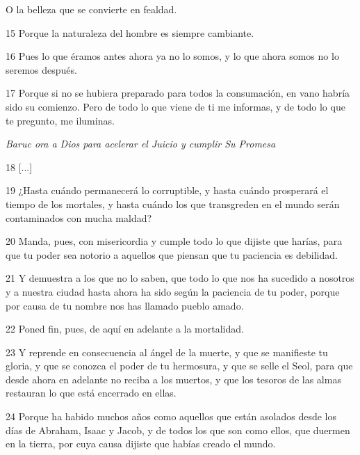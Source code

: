 \par O la belleza que se convierte en fealdad.

\par 15 Porque la naturaleza del hombre es siempre cambiante.

\par 16 Pues lo que éramos antes ahora ya no lo somos, y lo que ahora somos no lo seremos después.

\par 17 Porque si no se hubiera preparado para todos la consumación, en vano habría sido su comienzo. Pero de todo lo que viene de ti me informas, y de todo lo que te pregunto, me iluminas.

\par \textit{Baruc ora a Dios para acelerar el Juicio y cumplir Su Promesa}

\par 18 [...]

\par 19 ¿Hasta cuándo permanecerá lo corruptible, y hasta cuándo prosperará el tiempo de los mortales, y hasta cuándo los que transgreden en el mundo serán contaminados con mucha maldad?

\par 20 Manda, pues, con misericordia y cumple todo lo que dijiste que harías, para que tu poder sea notorio a aquellos que piensan que tu paciencia es debilidad.

\par 21 Y demuestra a los que no lo saben, que todo lo que nos ha sucedido a nosotros y a nuestra ciudad hasta ahora ha sido según la paciencia de tu poder, porque por causa de tu nombre nos has llamado pueblo amado.

\par 22 Poned fin, pues, de aquí en adelante a la mortalidad.

\par 23 Y reprende en consecuencia al ángel de la muerte, y que se manifieste tu gloria, y que se conozca el poder de tu hermosura, y que se selle el Seol, para que desde ahora en adelante no reciba a los muertos, y que los tesoros de las almas restauran lo que está encerrado en ellas.

\par 24 Porque ha habido muchos años como aquellos que están asolados desde los días de Abraham, Isaac y Jacob, y de todos los que son como ellos, que duermen en la tierra, por cuya causa dijiste que habías creado el mundo.

